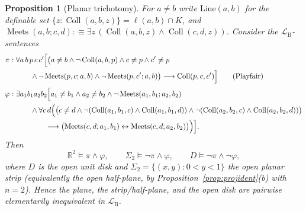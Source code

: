 \documentclass[11pt]{amsart}
\newtheorem{proposition}[theorem]{Proposition}
\theoremstyle{definition}
\newcommand{\R}{\mathbb{R}}
\newcommand{\LB}{\mathcal{L}_{\mathrm{B}}}
\newcommand{\Coll}{\operatorname{Coll}}
\newcommand{\Meets}{\operatorname{Meets}}
\begin{document}
\begin{proposition}[Planar trichotomy]\label{prop:trichotomy2}
For $a\ne b$ write $\mathrm{Line}(a,b)$ for the definable set
$\{z:\Coll(a,b,z)\}=\ell(a,b)\cap K$, and
$\Meets(a,b;c,d):\equiv\exists z\,(\Coll(a,b,z)\wedge\Coll(c,d,z))$.
Consider the $\LB$-sentences
\begin{align*}
\pi:\;&\forall a\,b\,p\,c\,c'\Bigl[\bigl(a\ne b\wedge\neg\Coll(a,b,p)\wedge
c\ne p\wedge c'\ne p\\
&\qquad\wedge\neg\Meets(p,c;a,b)\wedge\neg\Meets(p,c';a,b)\bigr)
\longrightarrow\Coll(p,c,c')\Bigr]
\tag{Playfair}\\[2pt]
\varphi:\;&\exists a_1 b_1 a_2 b_2\Bigl[a_1\ne b_1\wedge a_2\ne b_2\wedge
\neg\Meets(a_1,b_1;a_2,b_2)\\
&\qquad\wedge\forall c\,d\Bigl(\bigl(c\ne d\wedge
\neg(\Coll(a_1,b_1,c)\wedge\Coll(a_1,b_1,d))\wedge
\neg(\Coll(a_2,b_2,c)\wedge\Coll(a_2,b_2,d))\bigr)\\
&\qquad\qquad\longrightarrow
\bigl(\Meets(c,d;a_1,b_1)\leftrightarrow\Meets(c,d;a_2,b_2)\bigr)\Bigr)\Bigr].
\end{align*}
Then
\[
\R^2\models\pi\wedge\varphi,\qquad
\Sigma_2\models\neg\pi\wedge\varphi,\qquad
D\models\neg\pi\wedge\neg\varphi,
\]
where $D$ is the open unit disk and $\Sigma_2=\{(x,y):0<y<1\}$ the open
planar strip (equivalently the open half-plane, by
Proposition~\ref{prop:projident}(b) with $n=2$). Hence the plane, the
strip/half-plane, and the open disk are pairwise elementarily inequivalent
in $\LB$.
\end{proposition}
\end{document}
